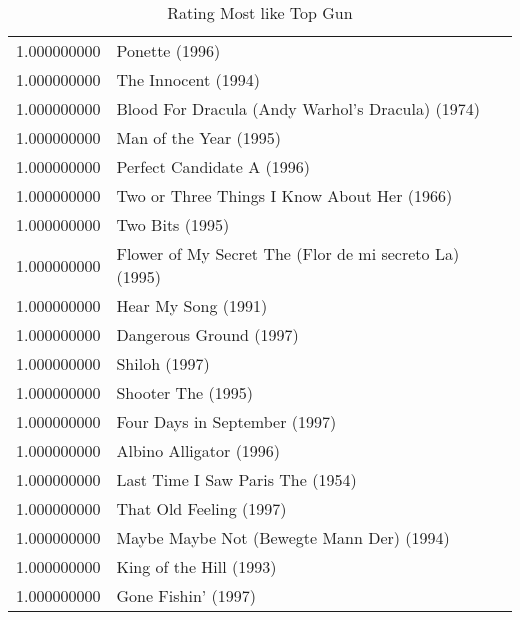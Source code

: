 \begin{flushleft}

\begin{table}[h]
\centering
\begin{tabular}{ll}
1.000000000 & Ponette (1996)                                                                  \\
1.000000000 & The Innocent (1994)                                                             \\
1.000000000 & Blood For Dracula (Andy Warhol's Dracula) (1974)                                \\
1.000000000 & Man of the Year (1995)                                                          \\
1.000000000 & Perfect Candidate A (1996)                                                      \\
1.000000000 & Two or Three Things I Know About Her (1966)                                     \\
1.000000000 & Two Bits (1995)                                                                 \\
1.000000000 & Flower of My Secret The (Flor de mi secreto La) (1995)                          \\
1.000000000 & Hear My Song (1991)                                                             \\
1.000000000 & Dangerous Ground (1997)                                                         \\
1.000000000 & Shiloh (1997)                                                                   \\
1.000000000 & Shooter The (1995)                                                              \\
1.000000000 & Four Days in September (1997)                                                   \\
1.000000000 & Albino Alligator (1996)                                                         \\
1.000000000 & Last Time I Saw Paris The (1954)                                                \\
1.000000000 & That Old Feeling (1997)                                                         \\
1.000000000 & Maybe Maybe Not (Bewegte Mann Der) (1994)                                       \\
1.000000000 & King of the Hill (1993)                                                         \\
1.000000000 & Gone Fishin' (1997)                     
\end{tabular}
\caption{Rating Most like Top Gun}
\end{table}



\end{flushleft}
